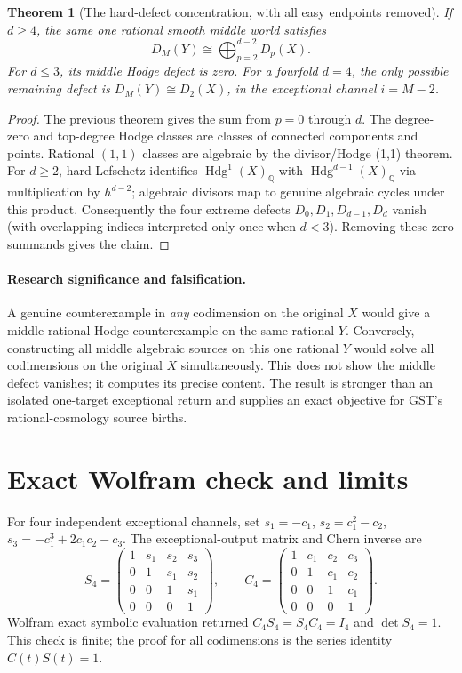 \documentclass[11pt]{article}
\newcommand{\Q}{\mathbb Q}
\newcommand{\Hdg}{\operatorname{Hdg}}
\newtheorem{theorem}{Theorem}
\begin{document}
\begin{theorem}[The hard-defect concentration, with all easy endpoints removed]
If $d\ge4$, the same one rational smooth middle world satisfies
\[
 \boxed{
 D_M(Y)\cong\bigoplus_{p=2}^{d-2}D_p(X).}
\]
For $d\le3$, its middle Hodge defect is zero.
For a fourfold $d=4$, the only possible remaining defect is
$D_M(Y)\cong D_2(X)$, in the exceptional channel $i=M-2$.
\end{theorem}
\begin{proof}
The previous theorem gives the sum from $p=0$ through $d$.
The degree-zero and top-degree Hodge classes are classes
of connected components and points. Rational $(1,1)$ classes
are algebraic by the divisor/Hodge (1,1) theorem.
For $d\ge2$, hard Lefschetz identifies
$\Hdg^1(X)_{\Q}$ with $\Hdg^{d-1}(X)_{\Q}$
via multiplication by $h^{d-2}$; algebraic
divisors map to genuine algebraic cycles under this
product. Consequently the four extreme defects
$D_0,D_1,D_{d-1},D_d$ vanish (with overlapping
indices interpreted only once when $d<3$).
Removing these zero summands gives the claim.
\end{proof}

\paragraph{Research significance and falsification.}
A genuine counterexample in \emph{any} codimension on the
original $X$ would give a middle rational Hodge counterexample
on the same rational $Y$. Conversely, constructing all middle
algebraic sources on this one rational $Y$ would solve all
codimensions on the original $X$ simultaneously.
This does not show the middle defect vanishes; it computes
its precise content. The result is stronger than an isolated
one-target exceptional return and supplies an exact objective
for GST's rational-cosmology source births.

\section{Exact Wolfram check and limits}
For four independent exceptional channels, set
$s_1=-c_1$, $s_2=c_1^2-c_2$,
$s_3=-c_1^3+2c_1c_2-c_3$.
The exceptional-output matrix and Chern inverse are
\[
 S_4=\begin{pmatrix}
 1&s_1&s_2&s_3\\0&1&s_1&s_2\\0&0&1&s_1\\0&0&0&1
 \end{pmatrix},\qquad
 C_4=\begin{pmatrix}
 1&c_1&c_2&c_3\\0&1&c_1&c_2\\0&0&1&c_1\\0&0&0&1
 \end{pmatrix}.
\]
Wolfram exact symbolic evaluation returned
$C_4S_4=S_4C_4=I_4$ and $\det S_4=1$.
This check is finite; the proof for all codimensions
is the series identity $C(t)S(t)=1$.
\end{document}
